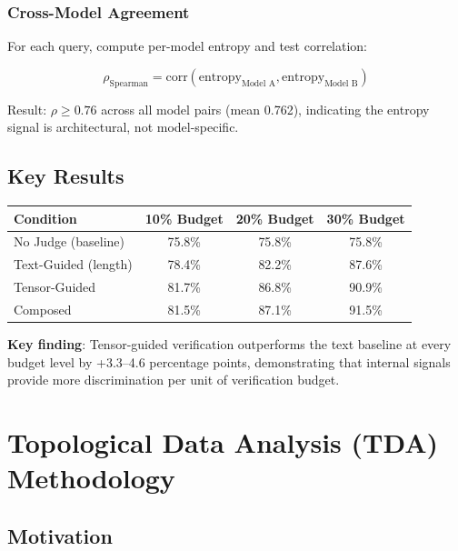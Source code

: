 \documentclass[12pt]{article}
\begin{document}
\subsubsection{Cross-Model Agreement}

For each query, compute per-model entropy and test correlation:

\begin{equation}
\rho_{\text{Spearman}} = \text{corr}(\text{entropy}_{\text{Model A}}, \text{entropy}_{\text{Model B}})
\end{equation}

Result: $\rho \geq 0.76$ across all model pairs (mean 0.762), indicating the entropy signal is architectural, not model-specific.

\subsection{Key Results}

\begin{table}[H]
\centering
\begin{tabular}{lccc}
\toprule
\textbf{Condition} & \textbf{10\% Budget} & \textbf{20\% Budget} & \textbf{30\% Budget} \\
\midrule
No Judge (baseline) & 75.8\% & 75.8\% & 75.8\% \\
Text-Guided (length) & 78.4\% & 82.2\% & 87.6\% \\
Tensor-Guided & 81.7\% & 86.8\% & 90.9\% \\
Composed & 81.5\% & 87.1\% & 91.5\% \\
\bottomrule
\end{tabular}
\end{table}

\textbf{Key finding}: Tensor-guided verification outperforms the text baseline at every budget level by +3.3--4.6 percentage points, demonstrating that internal signals provide more discrimination per unit of verification budget.


\section{Topological Data Analysis (TDA) Methodology}

\subsection{Motivation}
\end{document}
